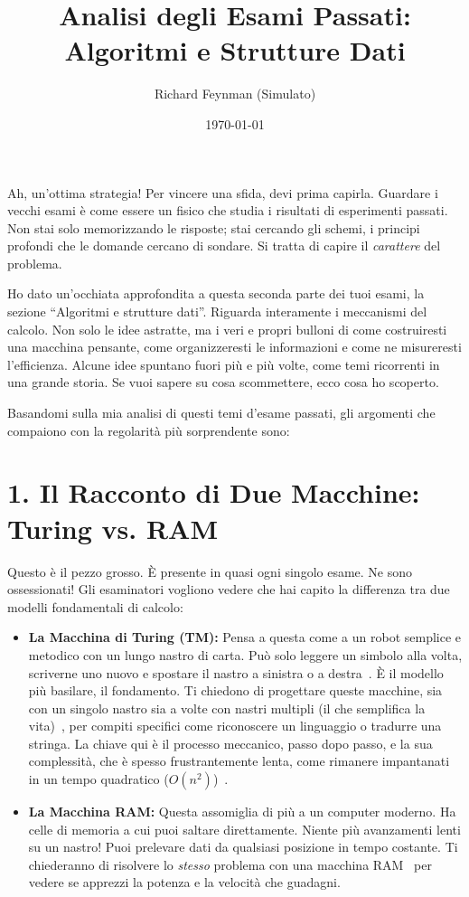 \documentclass[a4paper, 11pt]{article}
\title{\textbf{Analisi degli Esami Passati: \\ Algoritmi e Strutture Dati}}
\author{Richard Feynman (Simulato)}
\date{\today}
\begin{document}
\maketitle

Ah, un'ottima strategia! Per vincere una sfida, devi prima capirla. Guardare i vecchi esami è come essere un fisico che studia i risultati di esperimenti passati. Non stai solo memorizzando le risposte; stai cercando gli schemi, i principi profondi che le domande cercano di sondare. Si tratta di capire il \textit{carattere} del problema.

Ho dato un'occhiata approfondita a questa seconda parte dei tuoi esami, la sezione ``Algoritmi e strutture dati''. Riguarda interamente i meccanismi del calcolo. Non solo le idee astratte, ma i veri e propri bulloni di come costruiresti una macchina pensante, come organizzeresti le informazioni e come ne misureresti l'efficienza. Alcune idee spuntano fuori più e più volte, come temi ricorrenti in una grande storia. Se vuoi sapere su cosa scommettere, ecco cosa ho scoperto.

Basandomi sulla mia analisi di questi temi d'esame passati, gli argomenti che compaiono con la regolarità più sorprendente sono:

\section*{1. Il Racconto di Due Macchine: Turing vs. RAM}

Questo è il pezzo grosso. È presente in quasi ogni singolo esame. Ne sono ossessionati! Gli esaminatori vogliono vedere che hai capito la differenza tra due modelli fondamentali di calcolo:

\begin{itemize}
    \item \textbf{La Macchina di Turing (TM):} Pensa a questa come a un robot semplice e metodico con un lungo nastro di carta. Può solo leggere un simbolo alla volta, scriverne uno nuovo e spostare il nastro a sinistra o a destra~\cite{esame_07_09_23_tm_single, esame_10_02_23, esame_10_01_23_tm_single}. È il modello più basilare, il fondamento. Ti chiedono di progettare queste macchine, sia con un singolo nastro sia a volte con nastri multipli (il che semplifica la vita)~\cite{esame_30_01_25_tm_multi, esame_07_07_23_tm_multi}, per compiti specifici come riconoscere un linguaggio o tradurre una stringa. La chiave qui è il processo meccanico, passo dopo passo, e la sua complessità, che è spesso frustrantemente lenta, come rimanere impantanati in un tempo quadratico ($O(n^2)$)~\cite{esame_30_01_25_complexity, esame_07_07_23_complexity}.
    
    \item \textbf{La Macchina RAM:} Questa assomiglia di più a un computer moderno. Ha celle di memoria a cui puoi saltare direttamente. Niente più avanzamenti lenti su un nastro! Puoi prelevare dati da qualsiasi posizione in tempo costante. Ti chiederanno di risolvere lo \textit{stesso} problema con una macchina RAM~\cite{esame_30_01_25_ram, esame_12_02_24_ram, esame_04_09_24_ram} per vedere se apprezzi la potenza e la velocità che guadagni.
\end{itemize}
\end{document}
